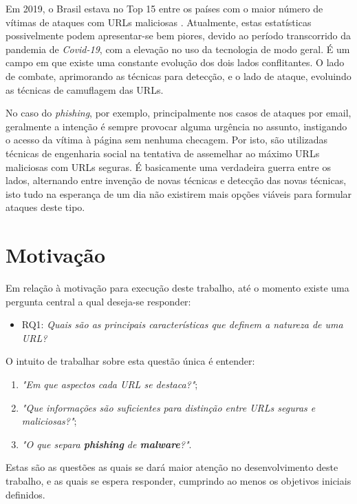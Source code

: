 \documentclass[manuscript,screen,review]{acmart}
\begin{document}
Em 2019, o Brasil estava no Top 15 entre os países com o maior número de vítimas de ataques com URLs maliciosas \cite{evilurl}. Atualmente, estas estatísticas possivelmente podem apresentar-se bem piores, devido ao período transcorrido da pandemia de \emph{Covid-19}, com a elevação no uso da tecnologia de modo geral.  É um campo em que existe uma constante evolução dos dois lados conflitantes. O lado de combate, aprimorando as técnicas para detecção, e o lado de ataque, evoluindo as técnicas de camuflagem das URLs.

No caso do \emph{phishing}, por exemplo, principalmente nos casos de ataques por email, geralmente a intenção é sempre provocar alguma urgência no assunto, instigando o acesso da vítima à página sem nenhuma checagem. Por isto, são utilizadas técnicas de engenharia social na tentativa de assemelhar ao máximo URLs maliciosas com URLs seguras. É basicamente uma verdadeira guerra entre os lados, alternando entre invenção de novas técnicas e detecção das novas técnicas, isto tudo na esperança de um dia não existirem mais opções viáveis para formular ataques deste tipo.

\section{Motivação}

Em relação à motivação para execução deste trabalho, até o momento existe uma pergunta central a qual deseja-se responder:

\begin{itemize}
    \item RQ1: \textit{Quais são as principais características que definem a natureza de uma URL?} 
\end{itemize}

O intuito de trabalhar sobre esta questão única é entender:

\begin{enumerate}
    \item \textit{"Em que aspectos cada URL se destaca?"};
    \item \textit{"Que informações são suficientes para distinção entre URLs seguras e maliciosas?"};
    \item \textit{"O que separa \textbf{phishing} de \textbf{malware}?"}.
\end{enumerate}

Estas são as questões as quais se dará maior atenção no desenvolvimento deste trabalho, e as quais se espera responder, cumprindo ao menos os objetivos iniciais definidos.
\end{document}
